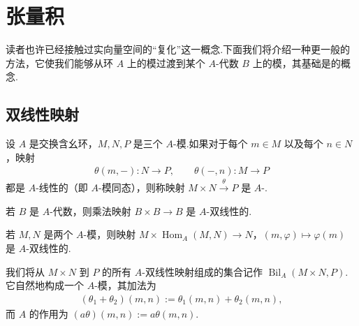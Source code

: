 \section{张量积}\label{sec:galois-1-8}
读者也许已经接触过实向量空间的``复化''这一概念.下面我们将介绍一种更一般的方法，它使我们能够从环 $A$ 上的模过渡到某个 $A$-代数 $B$ 上的模，其基础是的概念.

\subsection{双线性映射}\label{sec:galois-1-8-1}
设 $A$ 是交换含幺环，$M,N,P$ 是三个 $A$-模.如果对于每个 $m\in M$ 以及每个 $n\in N$，映射
\begin{align*}
\theta(m,-):N\longrightarrow P,\qquad \theta(-,n):M\longrightarrow P
\end{align*}
都是 $A$-线性的（即 $A$-模同态），则称映射 $M\times N\xrightarrow{\theta}P$ 是 $A$-.
\begin{example*}
若 $B$ 是 $A$-代数，则乘法映射 $B\times B\longrightarrow B$ 是 $A$-双线性的.
\end{example*}
\begin{example*}
若 $M,N$ 是两个 $A$-模，则映射 $M\times\operatorname{Hom}_A(M,N)\longrightarrow N$，$(m,\varphi)\mapsto\varphi(m)$ 是 $A$-双线性的.
\end{example*}
我们将从 $M\times N$ 到 $P$ 的所有 $A$-双线性映射组成的集合记作 $\operatorname{Bil}_A(M\times N,P)$.它自然地构成一个 $A$-模，其加法为
\begin{align*}
(\theta_1+\theta_2)(m,n):=\theta_1(m,n)+\theta_2(m,n),
\end{align*}
而 $A$ 的作用为 $(a\theta)(m,n):=a\theta(m,n)$.

